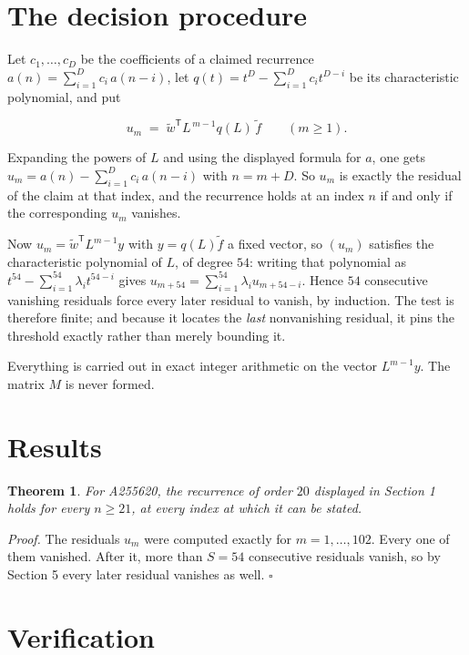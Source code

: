 \documentclass[11pt]{article}
\newtheorem{theorem}{Theorem}
\theoremstyle{definition}
\begin{document}
\section{The decision procedure}

Let $c_1,\dots,c_D$ be the coefficients of a claimed recurrence $a(n) = \sum_{i=1}^{D} c_i\,a(n-i)$, let $q(t) = t^{D} - \sum_{i=1}^{D} c_i t^{D-i}$ be its characteristic polynomial, and put

\[u_m \;=\; \tilde w^{\mathsf T} L^{\,m-1} q(L)\,\tilde f \qquad (m \ge 1).\]

Expanding the powers of $L$ and using the displayed formula for $a$, one gets $u_m = a(n) - \sum_{i=1}^{D} c_i\,a(n-i)$ with $n = m + D$. So $u_m$ is exactly the residual of the claim at that index, and the recurrence holds at an index $n$ if and only if the corresponding $u_m$ vanishes.

Now $u_m = \tilde w^{\mathsf T} L^{m-1} y$ with $y = q(L)\tilde f$ a fixed vector, so $(u_m)$ satisfies the characteristic polynomial of $L$, of degree $54$: writing that polynomial as $t^{54} - \sum_{i=1}^{54} \lambda_i t^{54-i}$ gives $u_{m+54} = \sum_{i=1}^{54} \lambda_i u_{m+54-i}$. Hence $54$ consecutive vanishing residuals force every later residual to vanish, by induction. The test is therefore finite; and because it locates the {\itshape last} nonvanishing residual, it pins the threshold exactly rather than merely bounding it.

Everything is carried out in exact integer arithmetic on the vector $L^{m-1}y$. The matrix $M$ is never formed.

\section{Results}

\begin{theorem} For A255620, the recurrence of order $20$ displayed in Section 1 holds for every $n \ge 21$, at every index at which it can be stated.\end{theorem}

{\itshape Proof.} The residuals $u_m$ were computed exactly for $m = 1,\dots,102$. Every one of them vanished. After it, more than $S = 54$ consecutive residuals vanish, so by Section 5 every later residual vanishes as well. $\square$

\section{Verification}
\end{document}
